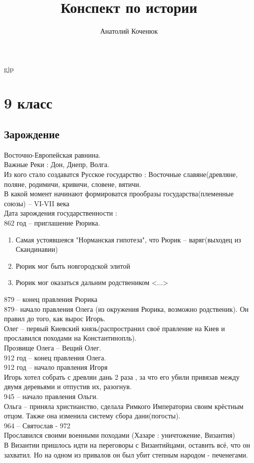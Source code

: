 gjp	 \documentclass[12pt,a4paper]{article}
\author{Анатолий Коченюк}
\title{Конспект по истории}
\begin{document}
 \section{9 класс}
\subsection{Зарождение}
Восточно-Европейская равнина.\\
Важные Реки : Дон, Днепр, Волга.\\
Из кого стало создаватся Русское государство : Восточные славяне(древляне, поляне, родимичи, кривичи, словене, вятичи.\\
В какой момент начинают формироватся прообразы государства(племенные союзы) -- VI-VII века\\
Дата зарождения государственности :\\
862 год -- приглашение Рюрика.\\
\begin{enumerate}
\item Самая устоявшеяся "Норманская гипотеза", что Рюрик -- варяг(выходец из Скандинавии)
\item Рюрик мог быть новгородской элитой
\item Рюрик мог оказаться дальним родствеником <...>
\end{enumerate}
879 -- конец правления Рюрика\\
879-- начало правления Олега (из окружения Рюрика, возможно родственик). Он правил до того, как вырос Игорь.\\
Олег -- первый Киевский князь(распространил своё правление на Киев и прославился походами на Константинопль).\\
Прозвище Олега -- Вещий Олег.\\
912 год -- конец правления Олега.\\
912 год -- начало правления Игоря\\
Игорь хотел собрать с древлян дань 2 раза , за что его убили привязав между двумя деревьями и отпустив их, разогнув.\\
945 -- начало правления Ольги.\\
Ольга -- приняла христианство, сделала Римкого Императориа своим крёстным отцом. Также она изменила систему сбора дани(погосты).\\
964 -- Святослав - 972\\
Прославился своими военными походами (Хазаре : уничтожение, Византия)\\
В Византии пришлось идти на переговоры с Византийцами, оставить всё, что он захватил. Но на одном из привалов он был убит степным народом - печенегами.\\
\end{document}
